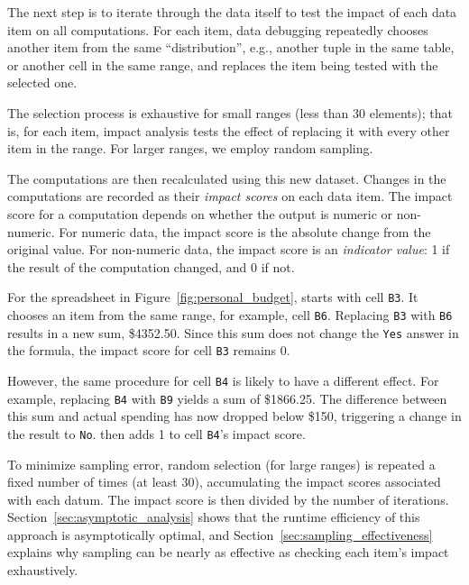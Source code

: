 The next step is to iterate through the data itself to test the impact
of each data item on all computations. For each item, data debugging
repeatedly chooses another item from the same ``distribution'', e.g.,
another tuple in the same table, or another cell in the same range,
and replaces the item being tested with the selected one. 

The selection process is exhaustive for small ranges (less than 30
elements); that is, for each item, impact analysis tests the effect of
replacing it with every other item in the range. For larger ranges, we
employ random sampling.

The computations are then recalculated using this new dataset. Changes
in the computations are recorded as their \emph{impact scores} on each
data item.  The impact score for a computation depends on whether the
output is numeric or non-numeric. For numeric data, the impact score
is the absolute change from the original value.
For non-numeric data, the impact score is an \emph{indicator value}: 1
if the result of the computation changed, and 0 if not.

For the spreadsheet in Figure~\ref{fig:personal_budget}, \checkcell{}
starts with cell \texttt{B3}. It chooses an item from the same
range, for example, cell \texttt{B6}. Replacing \texttt{B3}
with \texttt{B6} results in a new sum, \$4352.50. Since this sum does
not change the \texttt{Yes} answer in the formula, the impact score
for cell \texttt{B3} remains 0.

However, the same procedure for cell \texttt{B4} is likely to have a
different effect.  For example, replacing \texttt{B4}
with \texttt{B9} yields a sum of \$1866.25. The difference
between this sum and actual spending has now dropped below \$150,
triggering a change in the result to \texttt{No}. \checkcell{} then
adds 1 to cell \texttt{B4}'s impact score.


To minimize sampling error, random
selection (for large ranges) is repeated a fixed number of times (at least 30),
accumulating the impact scores associated with each datum. The impact
score is then divided by the number of
iterations. Section~\ref{sec:asymptotic_analysis} shows that the
runtime efficiency of this approach is asymptotically optimal, and
Section~\ref{sec:sampling_effectiveness} explains why sampling can be nearly as
effective as checking each item's impact exhaustively.

